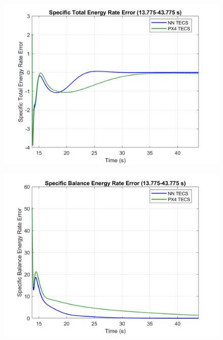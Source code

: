\documentclass[journal,article,submit,pdftex,moreauthors]{Definitions/mdpi}
\begin{document}
\begin{figure}[H]
    \centering
    \begin{minipage}{0.45\textwidth}
        \centering
        \includegraphics[width=\linewidth]{figures/ste_rate_error_plot.png}
        \label{fig:ste_rate_error}
    \end{minipage}
    \hfill
    \begin{minipage}{0.45\textwidth}
        \centering
        \includegraphics[width=\linewidth]{figures/sbe_rate_error_plot.png}
        \label{fig:sbe_rate_error}
    \end{minipage}
\end{figure}
\end{document}
